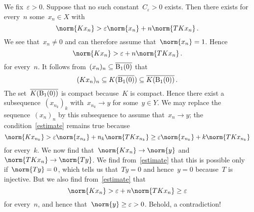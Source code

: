 \section{}





\subsection{}


We fix~$\varepsilon > 0$.
Suppose that no such constant~$C_\varepsilon > 0$ exists.
Then there exists for every~$n$ some~$x_n \in X$ with
\[
  \norm{ K x_n }
  >
  \varepsilon
  \norm{x_n}
  +
  n
  \norm{ T K x_n } \,.
\]
We see that~$x_n \neq 0$ and can therefore assume that~$\norm{x_n} = 1$.
Hence
\begin{equation}
  \label{estimate}
  \norm{ K x_n }
  >
  \varepsilon
  +
  n
  \norm{ T K x_n } \,.
\end{equation}
for every~$n$.
It follows from~$(x_n)_n \subseteq \overline{\operatorname{B}_{1}(0)}$ that
\[
  (K x_n)_n
  \subseteq
  K( \overline{\operatorname{B}_{1}(0)} )
  \subseteq
  \overline{ K(\operatorname{B}_{1}(0)) } \,.
\]
The set~$\overline{ K(\operatorname{B}_{1}(0)) }$ is compact because~$K$ is compact.
Hence there exist a subsequence~$(x_{n_k})_k$ with~$x_{n_k} \to y$ for some~$y \in Y$.
We may replace the sequence~$(x_n)_n$ by this subsequence to assume that~$x_n \to y$;
the condition~\eqref{estimate} remains true because
\[
  \norm{ K x_{n_k} }
  >
  \varepsilon
  \norm{x_{n_k}}
  +
  n_k
  \norm{ T K x_{n_k} }
  \geq
  \varepsilon
  \norm{x_{n_k}}
  +
  k
  \norm{ T K x_{n_k} }
\]
for every~$k$.
We now find that~$\norm{K x_n} \to \norm{y}$ and~$\norm{T K x_n} \to \norm{T y}$.
We find from~\eqref{estimate} that this is possible only if~$\norm{T y} = 0$, which tells us that~$Ty = 0$ and hence~$y = 0$ because~$T$ is injective.
But we also find from~\eqref{estimate} that
\[
  \norm{ K x_n }
  >
  \varepsilon
  +
  n
  \norm{ T K x_n }
  \geq
  \varepsilon
\]
for every~$n$, and hence that~$\norm{y} \geq \varepsilon > 0$.
Behold, a contradiction!



